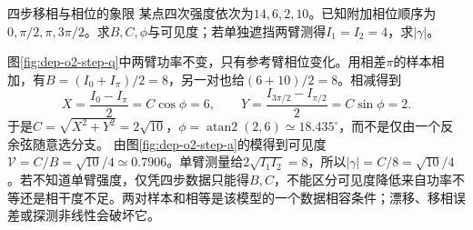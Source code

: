 \begin{example}四步移相与相位的象限
某点四次强度依次为$14,6,2,10$。已知附加相位顺序为$0,\pi/2,\pi,3\pi/2$。求$B,C,\phi$与可见度；若单独遮挡两臂测得$I_1=I_2=4$，求$|\gamma|$。
\end{example}
\begin{solution}
图\ref{fig:dep-o2-step-q}中两臂功率不变，只有参考臂相位变化。用相差$\pi$的样本相加，有$B=(I_0+I_\pi)/2=8$，另一对也给$(6+10)/2=8$。相减得到
\[
 X=\frac{I_0-I_\pi}{2}=C\cos\phi=6,\qquad
 Y=\frac{I_{3\pi/2}-I_{\pi/2}}2=C\sin\phi=2.
\]
于是$C=\sqrt{X^2+Y^2}=2\sqrt{10}$，$\phi=\operatorname{atan2}(2,6)\simeq18.435^\circ$，而不是仅由一个反余弦随意选分支。
由图\ref{fig:dep-o2-step-a}的模得到可见度$\mathcal V=C/B=\sqrt{10}/4\simeq0.7906$。单臂测量给$2\sqrt{I_1I_2}=8$，所以$|\gamma|=C/8=\sqrt{10}/4$。若不知道单臂强度，仅凭四步数据只能得$B,C$，不能区分可见度降低来自功率不等还是相干度不足。两对样本和相等是该模型的一个数据相容条件；漂移、移相误差或探测非线性会破坏它。
\end{solution}
